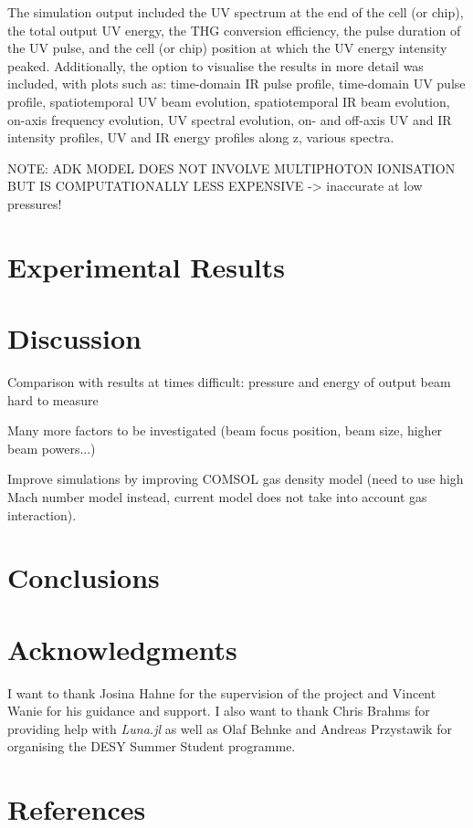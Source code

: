 \documentclass[a4paper]{jpconf}
\begin{document}
The simulation output included the UV spectrum at the end of the cell (or chip), the total output UV energy, the THG conversion efficiency, the pulse duration of the UV pulse, and the cell (or chip) position at which the UV energy intensity peaked. Additionally, the option to visualise the results in more detail was included, with plots such as: time-domain IR pulse profile, time-domain UV pulse profile, spatiotemporal UV beam evolution, spatiotemporal IR beam evolution, on-axis frequency evolution, UV spectral evolution, on- and off-axis UV and IR intensity profiles, UV and IR energy profiles along z, various spectra. \par 


NOTE: ADK MODEL DOES NOT INVOLVE MULTIPHOTON IONISATION BUT IS COMPUTATIONALLY LESS EXPENSIVE
-> inaccurate at low pressures! 
\section{Experimental Results}

\section{Discussion}
Comparison with results at times difficult: pressure and energy of output beam hard to measure


Many more factors to be investigated (beam focus position, beam size, higher beam powers...)


Improve simulations by improving COMSOL gas density model (need to use high Mach number model instead, current model does not take into account gas interaction). 

\section{Conclusions}

\section*{Acknowledgments}
I want to thank Josina Hahne for the supervision of the project and Vincent Wanie for his guidance and support. I also want to thank Chris Brahms for providing help with \textit{Luna.jl} as well as Olaf Behnke and Andreas Przystawik for organising the DESY Summer Student programme.  


\section*{References}


\end{document}
